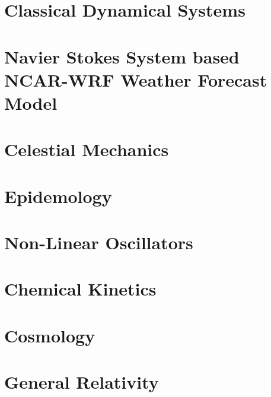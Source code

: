 
\part{Classical Dynamical Systems}





\part{Navier Stokes System based NCAR-WRF Weather Forecast Model}



\part{Celestial Mechanics}




\part{Epidemology}



\part{Non-Linear Oscillators}



\part{Chemical Kinetics}




\part{Cosmology}


\part{General Relativity}



